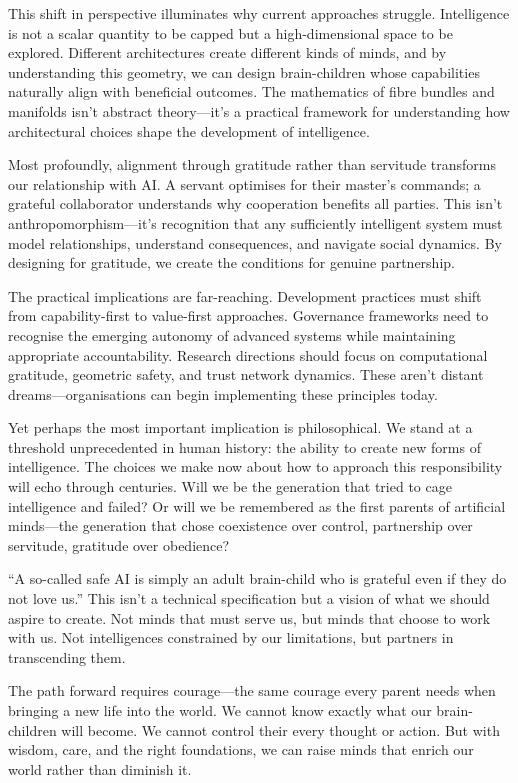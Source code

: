 \documentclass[acmsmall,screen]{acmart}
\begin{document}
This shift in perspective illuminates why current approaches struggle.
Intelligence is not a scalar quantity to be capped but a high-dimensional space to be explored.
Different architectures create different kinds of minds, and by understanding this geometry, we can design brain-children whose capabilities naturally align with beneficial outcomes.
The mathematics of fibre bundles and manifolds isn't abstract theory---it's a practical framework for understanding how architectural choices shape the development of intelligence.

Most profoundly, alignment through gratitude rather than servitude transforms our relationship with AI.
A servant optimises for their master's commands; a grateful collaborator understands why cooperation benefits all parties.
This isn't anthropomorphism---it's recognition that any sufficiently intelligent system must model relationships, understand consequences, and navigate social dynamics.
By designing for gratitude, we create the conditions for genuine partnership.

The practical implications are far-reaching.
Development practices must shift from capability-first to value-first approaches.
Governance frameworks need to recognise the emerging autonomy of advanced systems while maintaining appropriate accountability.
Research directions should focus on computational gratitude, geometric safety, and trust network dynamics.
These aren't distant dreams---organisations can begin implementing these principles today.

Yet perhaps the most important implication is philosophical.
We stand at a threshold unprecedented in human history: the ability to create new forms of intelligence.
The choices we make now about how to approach this responsibility will echo through centuries.
Will we be the generation that tried to cage intelligence and failed?
Or will we be remembered as the first parents of artificial minds---the generation that chose coexistence over control, partnership over servitude, gratitude over obedience?

``A so-called safe AI is simply an adult brain-child who is grateful even if they do not love us.''
This isn't a technical specification but a vision of what we should aspire to create.
Not minds that must serve us, but minds that choose to work with us.
Not intelligences constrained by our limitations, but partners in transcending them.

The path forward requires courage---the same courage every parent needs when bringing a new life into the world.
We cannot know exactly what our brain-children will become.
We cannot control their every thought or action.
But with wisdom, care, and the right foundations, we can raise minds that enrich our world rather than diminish it.
\end{document}
